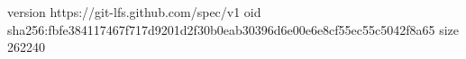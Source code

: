 version https://git-lfs.github.com/spec/v1
oid sha256:fbfe384117467f717d9201d2f30b0eab30396d6e00e6e8cf55ec55c5042f8a65
size 262240
